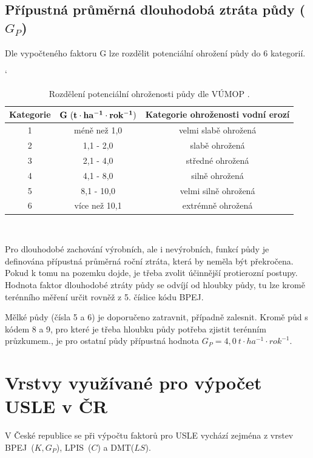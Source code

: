 \subsection{Přípustná průměrná dlouhodobá ztráta půdy ($G_P$)}
Dle vypočteného faktoru G lze rozdělit potenciální ohrožení půdy do 6
kategorií.\cite{vumop}

\begin{table}[!h]
\begin{center}
\catcode`
    \noindent\begin{tabular}{|*{3}{c|}} \hline \bf Kategorie & \bf
    $\bf G~(t\cdot ha^{-1}\cdot rok^{-1})$ & \bf Kategorie ohroženosti
    vodní erozí\\ \hline 1 & méně než 1,0 & velmi slabě
    ohrožená\\ \hline 2 & 1,1 - 2,0 & slabě ohrožená\\ \hline 3 & 2,1
    - 4,0 & středné ohrožená\\ \hline 4 & 4,1 - 8,0 & silně
    ohrožená\\ \hline 5 & 8,1 - 10,0 & velmi silně ohrožená\\ \hline 6
    & více než 10,1 & extrémně ohrožená\\ \hline
    \end{tabular}\\
  \caption[Rozdělení potenciální ohroženosti půdy]{Rozdělení
    potenciální ohroženosti půdy dle VÚMOP \cite{vumop}.}
  \label{tabulka_ohrozenost}
\end{center}
\end{table}
\FloatBarrier Pro dlouhodobé zachování výrobních, ale i nevýrobních,
funkcí půdy je definována přípustná průměrná roční ztráta, která by
neměla být překročena. Pokud k tomu na pozemku dojde, je třeba zvolit
účinnější protierozní postupy. Hodnota faktor dlouhodobé ztráty půdy
se odvíjí od hloubky půdy, tu lze kromě terénního měření určit rovněž
z 5. číslice kódu BPEJ.\cite{janecek2012}

Mělké půdy (čísla 5 a 6) je doporučeno zatravnit, případně
zalesnit. Kromě půd s kódem 8 a 9, pro které je třeba hloubku půdy
potřeba zjistit terénním průzkumem., je pro ostatní půdy přípustná
hodnota $G_P=4,0~t\cdot ha^{-1}\cdot rok^{-1}$.\cite{Novotny2014}
\newpage
\section{Vrstvy využívané pro výpočet USLE v ČR}
V České republice se při výpočtu faktorů pro USLE vychází zejména z
vrstev BPEJ~($K, G_P$), LPIS~($C$) a DMT($LS$).
